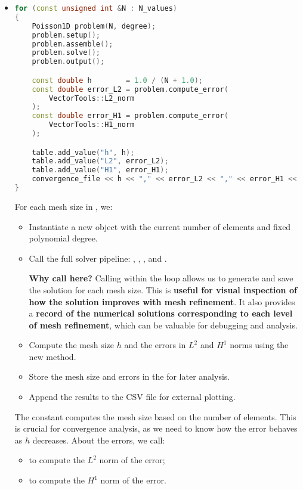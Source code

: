 \begin{itemize}
    \item {}
    \begin{lstlisting}[language=C++]
for (const unsigned int &N : N_values)
{
    Poisson1D problem(N, degree);
    problem.setup();
    problem.assemble();
    problem.solve();
    problem.output();

    const double h        = 1.0 / (N + 1.0);
    const double error_L2 = problem.compute_error(
        VectorTools::L2_norm
    );
    const double error_H1 = problem.compute_error(
        VectorTools::H1_norm
    );

    table.add_value("h", h);
    table.add_value("L2", error_L2);
    table.add_value("H1", error_H1);
    convergence_file << h << "," << error_L2 << "," << error_H1 << std::endl;
}\end{lstlisting}
    For each mesh size in , we:
    \begin{itemize}
        \item Instantiate a new  object with the current number of elements and fixed polynomial degree.
        \item Call the full solver pipeline: , , , and .

        \textcolor{Green3}{ \textbf{Why call  here?}} Calling  within the loop allows us to generate and save the solution for each mesh size. This is \textbf{useful for visual inspection of how the solution improves with mesh refinement}. It also provides a \textbf{record of the numerical solutions corresponding to each level of mesh refinement}, which can be valuable for debugging and analysis.
        \item Compute the mesh size $h$ and the errors in $L^2$ and $H^1$ norms using the new  method.
        \item Store the mesh size and errors in the  for later analysis.
        \item Append the results to the CSV file for external plotting.
    \end{itemize}
    The constant  computes the mesh size based on the number of elements. This is crucial for convergence analysis, as we need to know how the error behaves as $h$ decreases. About the errors, we call:
    \begin{itemize}
        \item {} to compute the $L^2$ norm of the error;
        \item {} to compute the $H^1$ norm of the error.
    \end{itemize}



\end{itemize}
